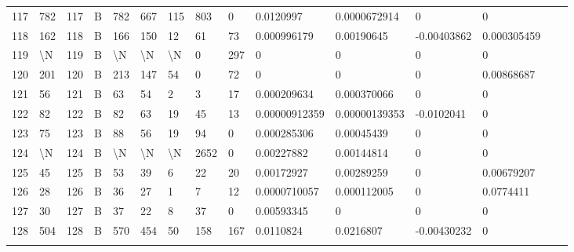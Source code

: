 \begin{longtable}{lllllllllllllll}
	117 & 782               & 117 & B   & 782               & 667               & 115               & 803  & 0          & 0.0120997      & 0.0000672914   & 0             & 0            \\
	118 & 162               & 118 & B   & 166               & 150               & 12                & 61   & 73         & 0.000996179    & 0.00190645     & -0.00403862   & 0.000305459  \\
	119 & \textbackslash{}N & 119 & B   & \textbackslash{}N & \textbackslash{}N & \textbackslash{}N & 0    & 297        & 0              & 0              & 0             & 0            \\
	120 & 201               & 120 & B   & 213               & 147               & 54                & 0    & 72         & 0              & 0              & 0             & 0.00868687   \\
	121 & 56                & 121 & B   & 63                & 54                & 2                 & 3    & 17         & 0.000209634    & 0.000370066    & 0             & 0            \\
	122 & 82                & 122 & B   & 82                & 63                & 19                & 45   & 13         & 0.00000912359  & 0.00000139353  & -0.0102041    & 0            \\
	123 & 75                & 123 & B   & 88                & 56                & 19                & 94   & 0          & 0.000285306    & 0.00045439     & 0             & 0            \\
	124 & \textbackslash{}N & 124 & B   & \textbackslash{}N & \textbackslash{}N & \textbackslash{}N & 2652 & 0          & 0.00227882     & 0.00144814     & 0             & 0         
	\begin{comment}   \\
	125 & 45                & 125 & B   & 53                & 39                & 6                 & 22   & 20         & 0.00172927     & 0.00289259     & 0             & 0.00679207   \\
	126 & 28                & 126 & B   & 36                & 27                & 1                 & 7    & 12         & 0.0000710057   & 0.000112005    & 0             & 0.0774411    \\
	127 & 30                & 127 & B   & 37                & 22                & 8                 & 37   & 0          & 0.00593345     & 0              & 0             & 0            \\
	128 & 504               & 128 & B   & 570               & 454               & 50                & 158  & 167        & 0.0110824      & 0.0216807      & -0.00430232   & 0            \\

\end{comment}
\end{longtable}
